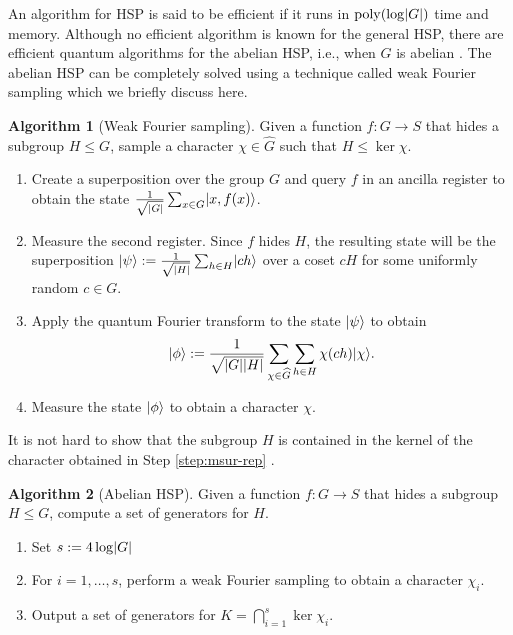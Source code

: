 \documentclass[11pt]{article}
\theoremstyle{plain}
\theoremstyle{definition}
\newtheorem{algo-thm}{Algorithm}
\DeclareMathOperator{\poly}{poly}
\DeclarePairedDelimiter{\abs}{\lvert}{\rvert}
\DeclarePairedDelimiter{\ket}{\lvert}{\rangle}
\begin{document}
An algorithm for HSP is said to be efficient if it runs in $\poly(\log \abs{G})$ time and memory. 
Although no efficient algorithm is known for the general HSP, there are efficient quantum algorithms 
for the abelian HSP, i.e., when $G$ is abelian \cite{hallgren2003hidden, kaye2007introduction}. The abelian HSP can be completely solved using a 
technique called weak Fourier sampling which we briefly discuss here.

\begin{algo-thm}[Weak Fourier sampling]
	\label{alg:wfs}
	Given a function $f: G \rightarrow S$ that hides a subgroup $H \le G$, sample a	character $\chi \in \widehat{G}$ such that $H \le \ker\chi$.
	\begin{enumerate}[topsep = 0pt, itemsep = 0pt, parsep = 0pt]
		\item Create a superposition over the group $G$ and query $f$ in an ancilla register to 
		obtain the state $\frac{1}{\sqrt{\abs{G}}} \sum_{x \in G} \ket{x, f(x)}$.
		\item Measure the second register. Since $f$ hides $H$, the resulting state will be the  
		superposition $\ket{\psi} := \frac{1}{\sqrt{\abs{H}}} \sum_{h \in H} \ket{ch}$ 
		over a coset $cH$ for some uniformly random $c \in G$.
		\item Apply the quantum Fourier transform to the state $\ket{\psi}$ to obtain
		\[ \ket{\phi} := \frac{1}{\sqrt{\abs{G}\abs{H}}} \sum_{\chi \in \widehat{G}} \sum_{h \in H} 
		\chi(ch) \ket{\chi}. \]
		\item\label{step:msur-rep} Measure the state $\ket{\phi}$ to obtain a character $\chi$.
	\end{enumerate}
\end{algo-thm}

It is not hard to show that the subgroup $H$ is contained in the kernel of the character
obtained in Step \ref{step:msur-rep} \cite{hallgren2003hidden}. 

\begin{algo-thm}[Abelian HSP]
	\label{alg:ahsp}
	Given a function $f: G \rightarrow S$ that hides a subgroup $H \le G$, compute a set of 
	generators for $H$.
	\begin{enumerate}[topsep = 0pt, itemsep = 0pt, parsep = 0pt]
		\item Set $s := 4\log \abs{G}$
		\item\label{step:hsp:loop} For $i = 1, \dots, s$, perform a weak Fourier sampling to obtain 
		a character $\chi_i$.
		\item\label{step:ker} Output a set of generators for $K = \bigcap_{i = 1}^s \ker \chi_i$.
	\end{enumerate}
\end{algo-thm}
\end{document}
